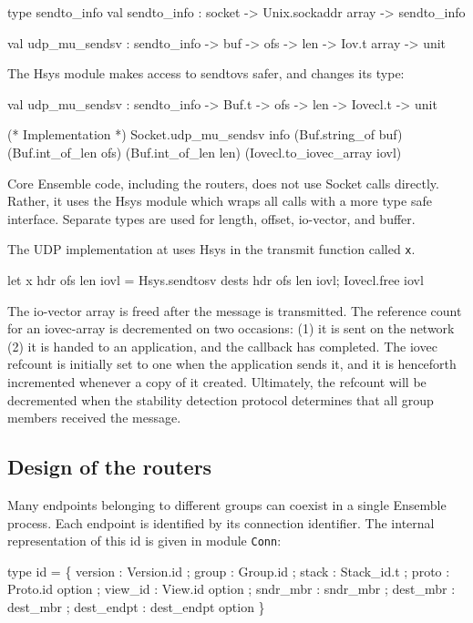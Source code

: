 \begin{codebox}
type sendto_info
val sendto_info : socket -> Unix.sockaddr array -> sendto_info

val udp_mu_sendsv : sendto_info -> buf -> ofs -> len -> Iov.t array -> unit
\end{codebox}


The Hsys module makes access to sendtovs safer, and changes its type:
\begin{codebox}
  val udp_mu_sendsv : sendto_info -> Buf.t -> ofs -> len -> Iovecl.t -> unit

  (* Implementation *)
  Socket.udp_mu_sendsv info 
    (Buf.string_of buf) (Buf.int_of_len ofs) (Buf.int_of_len len) 
    (Iovecl.to_iovec_array iovl) 
\end{codebox}
Core Ensemble code, including the routers, does not use Socket calls
directly. Rather, it uses the Hsys module which wraps all calls with a
more type safe interface. Separate types are used for length, offset,
io-vector, and buffer.

The UDP implementation at  uses Hsys in the 
transmit function called {\tt x}.

\begin{codebox}
  let x hdr ofs len iovl = 
    Hsys.sendtosv dests hdr ofs len iovl;
    Iovecl.free iovl
\end{codebox}

The io-vector array is freed after the message is transmitted. The
reference count for an iovec-array is decremented on two occasions:
(1) it is sent on the network (2) it is handed to an application, and
the callback has completed. The iovec refcount is initially set to one
when the application sends it, and it is henceforth incremented
whenever a copy of it created. Ultimately, the refcount will be
decremented when the stability detection protocol determines that all
group members received the message.

\subsection{Design of the routers}
Many endpoints belonging to different groups can coexist in a single
Ensemble process. Each endpoint is identified by its connection
identifier. The internal representation of this id is given in module
{\tt Conn}:

\begin{codebox}
type id = \{
  version       : Version.id ;
  group 	: Group.id ;
  stack 	: Stack_id.t ;
  proto 	: Proto.id option ;
  view_id 	: View.id option ;
  sndr_mbr 	: sndr_mbr ;
  dest_mbr 	: dest_mbr ;
  dest_endpt 	: dest_endpt option
\}
\end{codebox}

